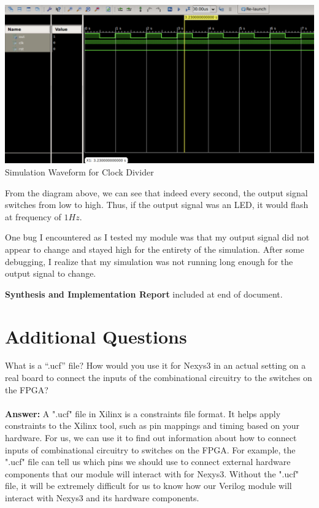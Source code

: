 \documentclass{article}
\begin{document}
\begin{enumerate}
\begin{center}
        \includegraphics[scale=0.5]{tb_seq2.png} \\
        \caption{Simulation Waveform for Clock Divider}
    \end{center}
    From the diagram above, we can see that indeed every second, the output signal switches from low to high. Thus, if the output signal was an LED, it would flash at frequency of $1Hz$. \par
    One bug I encountered as I tested my module was that my output signal did not appear to change and stayed high for the entirety of the simulation. After some debugging, I realize that my simulation was not running long enough for the output signal to change. \par
    \textbf{Synthesis and Implementation Report} included at end of document.
\end{enumerate}

\section{Additional Questions} 

 What is a “.ucf” file? How would you use it for Nexys3 in an actual setting on a real board to connect the inputs of the combinational circuitry to the switches on the FPGA? \\
 \\
\textbf{Answer: } A ".ucf" file in Xilinx is a constraints file format. It helps apply constraints to the Xilinx tool, such as pin mappings and timing based on your hardware. For us, we can use it to find out information about how to connect inputs of combinational circuitry to switches on the FPGA. For example, the ".ucf" file can tell us which pins we should use to connect external hardware components that our module will interact with for Nexys3. Without the ".ucf" file, it will be extremely difficult for us to know how our Verilog module will interact with Nexys3 and its hardware components.
\end{document}
